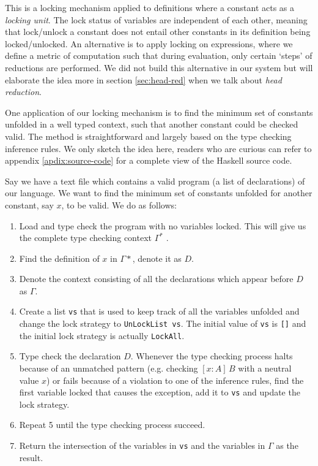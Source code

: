 \documentclass{article}
\theoremstyle{remark}
\begin{document}
This is a locking mechanism applied to definitions where a constant acts as a \emph{locking unit}. The lock status of variables are independent of each other, meaning that lock/unlock a constant does not entail other constants in its definition being locked/unlocked. An alternative is to apply locking on expressions, where we define a metric of computation such that during evaluation, only certain `steps' of reductions are performed. We did not build this alternative in our system but will elaborate the idea more in section \ref{sec:head-red} when we talk about \emph{head reduction}.

One application of our locking mechanism is to find the minimum set of constants unfolded in a well typed context, such that another constant could be checked valid. The method is straightforward and largely based on the type checking inference rules. We only sketch the idea here, readers who are curious can refer to appendix \ref{apdix:source-code} for a complete view of the Haskell source code.

Say we have a text file which contains a valid program (a list of declarations) of our language. We want to find the minimum set of constants unfolded for another constant, say $x$, to be valid. We do as follows:
\begin{enumerate}
\item Load and type check the program with no variables locked. This will give us the complete type checking context $\Gamma^*$ .
\item Find the definition of $x$ in $\Gamma*$, denote it as $D$.
\item Denote the context consisting of all the declarations which appear before $D$ as $\Gamma$.
\item Create a list \texttt{vs} that is used to keep track of all the variables unfolded and change the lock strategy to \texttt{UnLockList vs}. The initial value of \texttt{vs} is \texttt{[]} and the initial lock strategy is actually \texttt{LockAll}.
\item Type check the declaration $D$. Whenever the type checking process halts because of an unmatched pattern (e.g. checking $[x : A] \, B$ with a neutral value $x$) or fails because of a violation to one of the inference rules, find the first variable locked that causes the exception, add it to \texttt{vs} and update the lock strategy.
\item Repeat 5 until the type checking process succeed.
\item Return the intersection of the variables in \texttt{vs} and the variables in $\Gamma$ as the result.
\end{enumerate}
\end{document}
